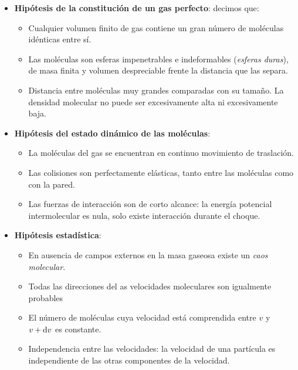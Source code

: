 \documentclass[12pt]{book}
\begin{document}
\begin{itemize}
\item \textbf{Hipótesis de la constitución de un gas perfecto}: decimos que:

\begin{itemize}
\item Cualquier volumen finito de gas contiene un gran número de moléculas idénticas entre sí. 

\item Las moléculas son esferas impenetrables e indeformables (\textit{esferas duras}), de masa finita y volumen despreciable frente la distancia que las separa.

\item Distancia entre moléculas muy grandes comparadas con su tamaño. La densidad molecular no puede ser excesivamente alta ni excesivamente baja.
\end{itemize}

\item \textbf{Hipótesis del estado dinámico de las moléculas}:

\begin{itemize}
\item La moléculas del gas se encuentran en continuo movimiento de traslación.
\item Las colisiones son perfectamente elásticas, tanto entre las moléculas como con la pared.
\item Las fuerzas de interacción son de corto alcance: la energía potencial intermolecular es nula, solo existe interacción durante el choque. 
\end{itemize}

\item  \textbf{Hipótesis estadística}:

\begin{itemize}
\item En ausencia de campos externos en la masa gaseosa existe un \textit{caos molecular}. 
\item Todas las direcciones del as velocidades moleculares son igualmente probables
\item El número de moléculas cuya velocidad está comprendida entre $v$ y $v + \mathrm{d} v$ es constante.
\item Independencia entre las velocidades: la velocidad de una partícula es independiente de las otras componentes de la velocidad.
\end{itemize}

\end{itemize}
\end{document}
